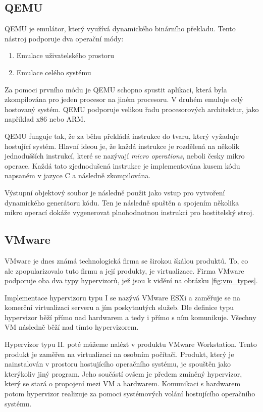 \subsection{QEMU}
QEMU je emulátor, který využívá dynamického binárního překladu. Tento nástroj podporuje dva operační módy:

\begin{enumerate}
    \item Emulace uživatelského prostoru
    \item Emulace celého systému
\end{enumerate}

Za pomoci prvního módu je QEMU schopno spustit aplikaci, která byla zkompilována pro jeden procesor na jiném procesoru. V druhém emuluje celý hostovaný systém. QEMU podporuje velikou řadu procesorových architektur, jako například x86 nebo ARM.\,\cite{chiueh2005survey}

QEMU funguje tak, že za běhu překládá instrukce do tvaru, který vyžaduje hostující systém. Hlavní ideou je, že každá instrukce je rozdělená na několik jednodušších instrukcí, které se nazývají \textit{micro operations}, neboli česky mikro operace. Každá tato zjednodušená instrukce je implementována kusem kódu napsaném v jazyce C a následně zkompilována.\,\cite{chiueh2005survey}\cite{bellard2005qemu}

Výstupní objektový soubor je následně použit jako vstup pro vytvoření dynamického generátoru kódu. Ten je následně spuštěn a spojením několika mikro operací dokáže vygenerovat plnohodnotnou instrukci pro hostitelský stroj.\,\cite{chiueh2005survey}\cite{bellard2005qemu}


\subsection{VMware}

VMware je dnes známá technologická firma se širokou škálou produktů. To, co ale zpopularizovalo tuto firmu a její produkty, je virtualizace. Firma VMware podporuje oba dva typy hypervizorů, jež jsou k vidění na obrázku \ref{fig:vm_types}. 

Implementace hypervizoru typu I se nazývá VMware ESXi a zaměřuje se na komerční virtualizaci serveru a jím poskytnutých služeb. Dle definice typu hypervizor běží přímo nad hardwarem a tedy i přímo s ním komunikuje. Všechny VM následně běží nad tímto hypervizorem.\,\cite{gillis_2022}

Hypervizor typu II. poté můžeme nalézt v produktu VMware Workstation. Tento produkt je zaměřen na virtualizaci na osobním počítači. Produkt, který je nainstalován v prostoru hostujícího operačního systému, je spouštěn jako kterýkoliv jiný program. Jeho součástí ovšem je předem zmíněný hypervizor, který se stará o propojení mezi VM a hardwarem. Komunikaci s hardwarem potom hypervizor realizuje za pomoci systémových volání hostujícího operačního systému.\,\cite{9647226}


